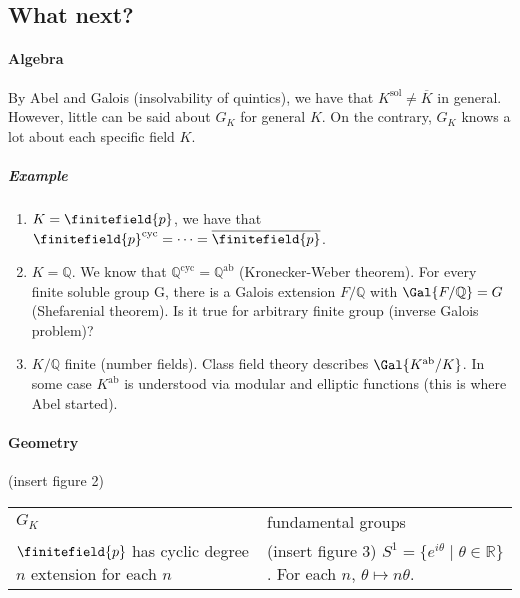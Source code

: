 \subsection{What next?}

\paragraph{Algebra}

By Abel and Galois (insolvability of quintics), we have that $K^{\text{sol}} \neq \overline{K}$ in general. However, little can be said about $G_K$ for general $K$.  On the contrary, $G_K$ knows a lot about each specific field $K$. 

\subparagraph{Example}

\begin{enumerate}
\item $K = \finitefield{p}$, we have that $\finitefield{p}^{\text{cyc}} = \dotsb = \overline{\finitefield{p}}$.
\item $K = \mathbb{Q}$. We know that $\mathbb{Q}^{\text{cyc}} = \mathbb{Q}^{\text{ab}}$ (Kronecker-Weber theorem). For every finite soluble group G, there is a Galois extension $F/\mathbb{Q}$ with $\Gal{F/\mathbb{Q}} = G$ (Shefarenial theorem). Is it true for arbitrary finite group (inverse Galois problem)?
\item $K/\mathbb{Q}$ finite (number fields). Class field theory describes $\Gal{K^{\text{ab}}/K}$. In some case $K^{\text{ab}}$ is understood via modular and elliptic functions (this is where Abel started).
\end{enumerate}

\paragraph{Geometry}

(insert figure 2)

\begin{tabular}{ll}
  $G_K$ & fundamental groups \\
  $\finitefield{p}$ has cyclic degree $n$ extension for each $n$ & (insert figure 3) $S^1 = \{ e^{i\theta} \mid \theta \in \mathbb{R} \}$. For each $n$, $\theta \mapsto n\theta$.
\end{tabular}